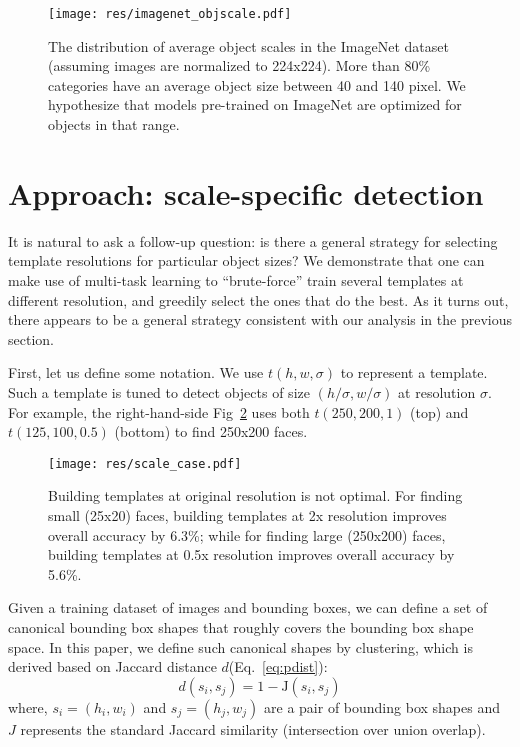 \documentclass[10pt,twocolumn,letterpaper]{article}
\begin{document}
\begin{figure}
  \centering
  \texttt{[image: res/imagenet\_objscale.pdf]}
  \caption{The distribution of average object scales in the ImageNet dataset (assuming images are normalized to 224x224). More than 80\% categories have an average object size between 40 and 140 pixel. We hypothesize that models pre-trained on ImageNet are optimized for objects in that range.  }
  \label{fig:imagenet}
\end{figure}







\section{Approach: scale-specific detection}
\label{sec:approach}



It is natural to ask a follow-up question: is there a general strategy for selecting template resolutions for particular object sizes? We demonstrate that one can make use of multi-task learning to ``brute-force'' train several templates at different resolution, and greedily select the ones that do the best. As it turns out, there appears to be a general strategy consistent with our analysis in the previous section.

First, let us define some notation. We use $t(h, w, \sigma)$ to represent a template. Such a template is tuned to detect objects of size $(h/\sigma, w/\sigma)$ at resolution $\sigma$. For example, the right-hand-side Fig~\ref{fig:scale-case} uses both $t(250,200,1)$ (top) and $t(125,100,0.5)$ (bottom) to find 250x200 faces. 

\begin{figure}[t]
  \centering
  \texttt{[image: res/scale\_case.pdf]}
  \caption{Building templates at original resolution is not optimal. For finding small (25x20) faces, building templates at 2x resolution improves overall accuracy by 6.3\%; while for finding large (250x200) faces, building templates at 0.5x resolution improves overall accuracy by 5.6\%. }
  \label{fig:scale-case}
\end{figure}

Given a training dataset of images and bounding boxes, we can define a set of canonical bounding box shapes that roughly covers the bounding box shape space. In this paper, we define such canonical shapes by clustering, which is derived based on Jaccard distance $d$(Eq.~\eqref{eq:pdist}):
\begin{equation}
  \label{eq:pdist}
  d(s_i,s_j) = 1 - \text{J}(s_i, s_j)
\end{equation}
where, $s_i=(h_i, w_i)$ and $s_j=(h_j, w_j)$ are a pair of bounding
box shapes and $J$ represents the standard Jaccard similarity (intersection over union overlap).
\end{document}
